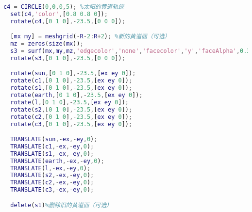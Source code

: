 \begin{lstlisting}[language=matlab]
  c4 = CIRCLE(0,0,0,5); %太阳的黄道轨迹
  set(c4,'color',[0.8 0.8 0]);
  rotate(c4,[0 1 0],-23.5,[0 0 0]);

  [mx my] = meshgrid(-R-2:R+2); %新的黄道面（可选）
  mz = zeros(size(mx));
  s3 = surf(mx,my,mz,'edgecolor','none','facecolor','y','faceAlpha',0.3); %黄道面
  rotate(s3,[0 1 0],-23.5,[0 0 0]);

  rotate(sun,[0 1 0],-23.5,[ex ey 0]);
  rotate(c1,[0 1 0],-23.5,[ex ey 0]);
  rotate(s1,[0 1 0],-23.5,[ex ey 0]);
  rotate(earth,[0 1 0],-23.5,[ex ey 0]);
  rotate(l,[0 1 0],-23.5,[ex ey 0]);
  rotate(s2,[0 1 0],-23.5,[ex ey 0]);
  rotate(c2,[0 1 0],-23.5,[ex ey 0]);
  rotate(c3,[0 1 0],-23.5,[ex ey 0]);

  TRANSLATE(sun,-ex,-ey,0);
  TRANSLATE(c1,-ex,-ey,0);
  TRANSLATE(s1,-ex,-ey,0);
  TRANSLATE(earth,-ex,-ey,0);
  TRANSLATE(l,-ex,-ey,0);
  TRANSLATE(s2,-ex,-ey,0);
  TRANSLATE(c2,-ex,-ey,0);
  TRANSLATE(c3,-ex,-ey,0);

  delete(s1)%删除旧的黄道面（可选）
\end{lstlisting}
